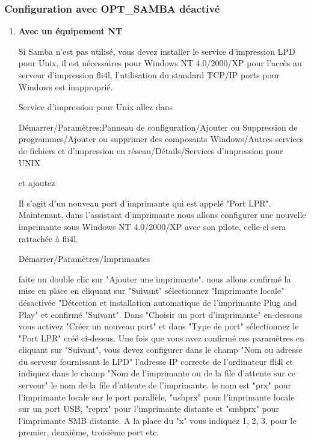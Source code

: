 \subsubsection{Configuration avec OPT\_SAMBA déactivé}
\begin{enumerate}
\item \textbf{Avec un équipement NT}

    Si Samba n'est pas utilisé, vous devez installer le service d'impression LPD
    pour Unix, il est nécessaires pour Windows NT 4.0/2000/XP pour l'accès au
    serveur d'impression fli4l, l'utilisation du standard TCP/IP ports pour
    Windows est inapproprié.

    Service d'impression pour Unix allez dans

    Démarrer/Paramètres:Panneau de configuration/Ajouter ou Suppression de
    programmes/Ajouter ou supprimer des composants Windows/Autres services de
    fichiers et d'impression en réseau/Détails/Services d'impression pour UNIX

    et ajoutez

    Il s'agit d'un nouveau port d'imprimante qui est appelé "Port LPR". Maintenant,
    dans l'assistant d'imprimante nous allons configurer une nouvelle imprimante
    sous Windows NT 4.0/2000/XP avec son pilote, celle-ci sera rattachée à fli4l.

    Démarrer/Paramètres/Imprimantes

    faite un double clic sur "Ajouter une imprimante". nous allons confirmé
    la mise en place en cliquant sur "Suivant" sélectionnez "Imprimante locale"
    désactivée "Détection et installation automatique de l'imprimante Plug and Play"
    et confirmé "Suivant". Dans "Choisir un port d'imprimante" en-dessous vous
    activez "Créer un nouveau port" et dans "Type de port" sélectionnez le
    "Port LPR" créé ci-dessus. Une fois que vous avez confirmé ces paramètres en
    cliquant sur "Suivant", vous devez configurer dans le champ "Nom ou adresse
    du serveur fournissant le LPD" l'adresse IP correcte de l'ordinateur fli4l
    et indiquez dans le champ "Nom de l'imprimante ou de la file d'attente sur
    ce serveur" le nom de la file d'attente de l'imprimante. le nom est "prx" pour
    l'imprimante locale sur le port parallèle, "usbprx" pour l'imprimante locale
    sur un port USB, "reprx" pour l'imprimante distante et "smbprx" pour l'imprimante
    SMB distante. A la place du "x" vous indiquez 1, 2, 3, pour le premier, deuxième,
    troisième port etc.


\end{enumerate}

